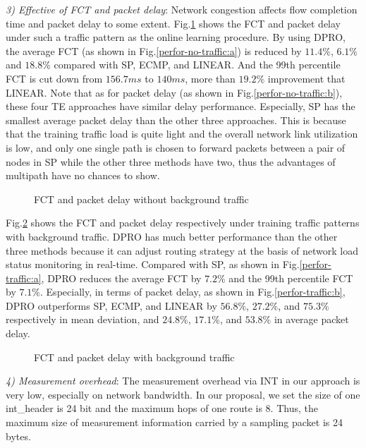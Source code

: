 \documentclass[10pt,conference]{IEEEtran}
\begin{document}
\emph{3) Effective of FCT and packet delay}: Network congestion affects flow completion time and packet delay to some extent. Fig.\ref{performance} shows the FCT and packet delay under such a traffic pattern as the online learning procedure. By using DPRO, the average FCT (as shown in Fig.\ref{perfor-no-traffic:a}) is reduced by $11.4\%$, $6.1\%$ and $18.8\%$ compared with SP, ECMP, and LINEAR. And the 99th percentile FCT is cut down from $156.7ms$ to $140ms$, more than $19.2\%$ improvement that LINEAR. Note that as for packet delay (as shown in Fig.\ref{perfor-no-traffic:b}), these four TE approaches have similar delay performance. Especially, SP has the smallest average packet delay than the other three approaches. This is because that the training traffic load is quite light and the overall network link utilization is low, and only one single path is chosen to forward packets between a pair of nodes in SP while the other three methods have two, thus the advantages of multipath have no chances to show.
\begin{figure}[t]
\centering
{}
\caption{FCT and packet delay without background traffic}
\label{performance}
\end{figure}

Fig.\ref{performance-with-bgf} shows the FCT and packet delay respectively under training traffic patterns with background traffic. DPRO has much better performance than the other three methods because it can adjust routing strategy at the basis of network load status monitoring in real-time. Compared with SP, as shown in Fig.\ref{perfor-traffic:a}, DPRO reduces the average FCT by $7.2\%$ and the 99th percentile FCT by $7.1\%$. Especially, in terms of packet delay, as shown in Fig.\ref{perfor-traffic:b}, DPRO outperforms SP, ECMP, and LINEAR by $56.8\%$, $27.2\%$, and $75.3\%$ respectively in mean deviation, and $24.8\%$, $17.1\%$, and $53.8\%$ in average packet delay.
\begin{figure}[t]
\centering
{}
\caption{FCT and packet delay with background traffic}
\label{performance-with-bgf}
\end{figure}

\emph{4) Measurement overhead}: The measurement overhead via INT in our approach is very low, especially on network bandwidth. In our proposal, we set the size of one int\_header is 24 bit and the maximum hops of one route is 8. Thus, the maximum size of measurement information carried by a sampling packet is 24 bytes.
\end{document}

